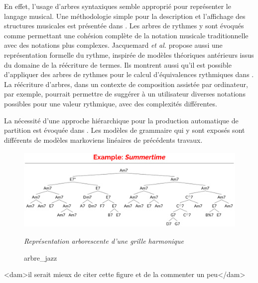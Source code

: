 
En effet, l’usage d’arbres syntaxiques semble approprié pour représenter le
langage musical. Une méthodologie simple pour la description et l'affichage des
structures musicales est présentée dans \cite{rythm_tree}. 
Les arbres de rythmes y sont évoqués comme permettant une cohésion complète de
la notation musicale traditionnelle avec des notations plus complexes.
Jacquemard \textit{et al.} \cite{jacquemard:hal-01134096} propose aussi une
représentation formelle du rythme, inspirée de modèles théoriques antérieurs
issus du domaine de la réécriture de termes. 
 Ils montrent aussi qu'il est possible d'appliquer des arbres de
rythmes pour le calcul d'équivalences rythmiques dans
\cite{jacquemard:hal-01403982}. La réécriture d’arbres, dans un contexte de
composition assistée par ordinateur, par exemple, pourrait permettre de
suggérer à un utilisateur diverses notations possibles pour une valeur
rythmique, avec des complexités différentes.

La nécessité d’une approche hiérarchique pour la production automatique de
partition est évoquée dans \cite{foscarin:hal-01988990}. 
Les modèles de grammaire qui y sont exposés sont différents de modèles
markoviens linéaires de précédents travaux.
\begin{figure}[h]
	\centering
	\includegraphics[height=40mm, width=120mm]{
    z_images/2_etat_de_l_art/1_summertime_tree.png}
	\caption{arbre\_jazz}
	\textit{Représentation arborescente d’une grille harmonique}
    \cite{harasimjazz}
\end{figure}
<dam>il serait mieux de citer cette figure et de la commenter un peu</dam>

